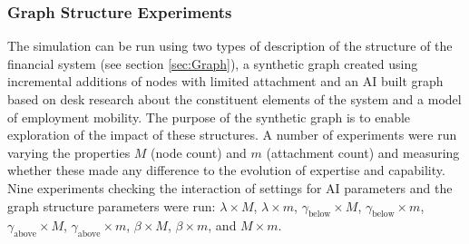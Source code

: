\documentclass[11pt]{article}
\begin{document}
\subsubsection{Graph Structure Experiments} \label{sec:graph_experiments}
The simulation can be run using two types of description of the structure of the financial system (see section \ref{sec:Graph}), a synthetic graph created using incremental additions of nodes with limited attachment and an AI built graph based on desk research about the constituent elements of the system and a model of employment mobility. The purpose of the synthetic graph is to enable exploration of the impact of these structures. A number of experiments were run varying the properties $M$ (node count) and $m$ (attachment count) and measuring whether these made any difference to the evolution of expertise and capability. Nine experiments checking the interaction of settings for AI parameters and the graph structure parameters were run: $\lambda \times M$, $\lambda \times m$, $\gamma_{\mathrm{below}} \times M$, $\gamma_{\mathrm{below}} \times m$, $\gamma_{\mathrm{above}} \times M$, $\gamma_{\mathrm{above}} \times m$, $\beta \times M$, $\beta \times m$, and $M \times m$.
\end{document}
